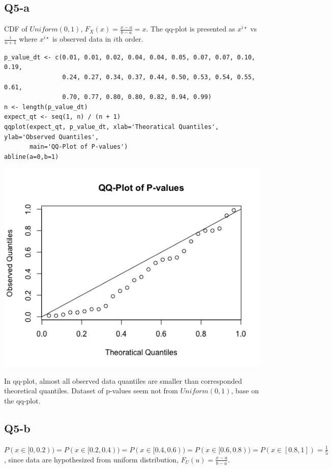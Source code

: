 \documentclass[11pt,letterpaper]{article}
\begin{document}
\subsection*{Q5-a}

\noindent CDF of $Uniform(0, 1)$, $F_X(x) = \frac{x-a}{b-a} = x$. The qq-plot is presented as $x^{i \star}$ vs $\frac{i}{n+1}$ where $x^{i \star}$ is observed data in $i$th order.

\begin{verbatim}
p_value_dt <- c(0.01, 0.01, 0.02, 0.04, 0.04, 0.05, 0.07, 0.07, 0.10, 0.19,
                0.24, 0.27, 0.34, 0.37, 0.44, 0.50, 0.53, 0.54, 0.55, 0.61,
                0.70, 0.77, 0.80, 0.80, 0.82, 0.94, 0.99)
n <- length(p_value_dt)
expect_qt <- seq(1, n) / (n + 1)  
qqplot(expect_qt, p_value_dt, xlab='Theoratical Quantiles', ylab='Observed Quantiles',
       main='QQ-Plot of P-values')
abline(a=0,b=1)
\end{verbatim}

\includegraphics[scale=0.6]{q5-a.png}

\noindent In qq-plot, almost all observed data quantiles are smaller than corresponded theoretical quantiles. Dataset of p-values seem not from $Uniform(0, 1)$, base on the qq-plot. 

\newpage
\subsection*{Q5-b}
\noindent $P(x \in [0, 0.2)) = P(x \in [0.2, 0.4)) = P(x \in [0.4, 0.6)) = P(x \in [0.6, 0.8)) =P(x \in [0.8, 1]) = \frac{1}{5}$, since data are hypothesized from uniform distribution, $F_U(u) = \frac{x-a}{b-a}$.\\
\end{document}
